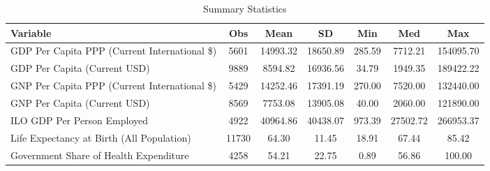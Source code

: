 \begin{table}
\centering
\caption{Summary Statistics}
\label{Sum_Stats}
\begin{tabular}{lcccccc}
\toprule
                                    Variable &   Obs &     Mean &       SD &    Min &      Med &       Max \\
\midrule
GDP Per Capita PPP (Current International \$) & 5601 & 14993.32 & 18650.89 & 285.59 & 7712.21 & 154095.70 \\
GDP Per Capita (Current USD) & 9889 & 8594.82 & 16936.56 & 34.79 & 1949.35 & 189422.22 \\
GNP Per Capita PPP (Current International \$) & 5429 & 14252.46 & 17391.19 & 270.00 & 7520.00 & 132440.00 \\
GNP Per Capita (Current USD) & 8569 & 7753.08 & 13905.08 & 40.00 & 2060.00 & 121890.00 \\
ILO GDP Per Person Employed & 4922 & 40964.86 & 40438.07 & 973.39 & 27502.72 & 266953.37 \\
Life Expectancy at Birth (All Population) & 11730 & 64.30 & 11.45 & 18.91 & 67.44 & 85.42 \\
Government Share of Health Expenditure & 4258 & 54.21 & 22.75 & 0.89 & 56.86 & 100.00 \\
\bottomrule
\end{tabular}
\end{table}
